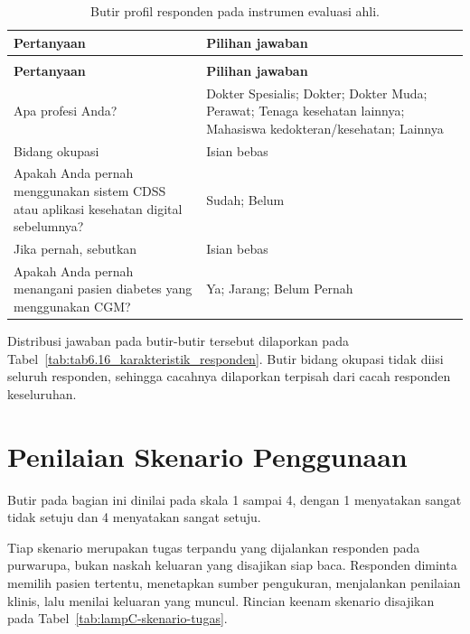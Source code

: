\begingroup
\setlength{\LTcapwidth}{\textwidth}
\begin{longtable}{@{}>{\raggedright\arraybackslash}p{6.400cm}>{\raggedright\arraybackslash}p{7.178cm}@{}}
\caption{Butir profil responden pada instrumen evaluasi ahli.}
\label{tab:lampC-profil} \\
\toprule
\textbf{Pertanyaan} & \textbf{Pilihan jawaban} \\
\midrule
\endfirsthead

\multicolumn{2}{@{}l}{\small\emph{Tabel \thetable{} (lanjutan)}} \\
\toprule
\textbf{Pertanyaan} & \textbf{Pilihan jawaban} \\
\midrule
\endhead

\bottomrule
\endlastfoot

Apa profesi Anda? & Dokter Spesialis; Dokter; Dokter Muda; Perawat; Tenaga kesehatan lainnya; Mahasiswa kedokteran/kesehatan; Lainnya \\

Bidang okupasi & Isian bebas \\

Apakah Anda pernah menggunakan sistem CDSS atau aplikasi kesehatan digital sebelumnya? & Sudah; Belum \\

Jika pernah, sebutkan & Isian bebas \\

Apakah Anda pernah menangani pasien diabetes yang menggunakan CGM? & Ya; Jarang; Belum Pernah \\
\end{longtable}
\endgroup

Distribusi jawaban pada butir-butir tersebut dilaporkan pada Tabel~\ref{tab:tab6.16_karakteristik_responden}. Butir bidang okupasi tidak diisi seluruh responden,
sehingga cacahnya dilaporkan terpisah dari cacah responden keseluruhan.

\section{Penilaian Skenario Penggunaan}
\label{lamp:instrumen-skenario}

Butir pada bagian ini dinilai pada skala 1 sampai 4, dengan 1 menyatakan sangat tidak setuju dan 4 menyatakan sangat setuju.

Tiap skenario merupakan tugas terpandu yang dijalankan responden pada purwarupa, bukan naskah keluaran yang disajikan siap baca. Responden diminta memilih pasien
tertentu, menetapkan sumber pengukuran, menjalankan penilaian klinis, lalu menilai keluaran yang muncul. Rincian keenam skenario disajikan pada
Tabel~\ref{tab:lampC-skenario-tugas}.

